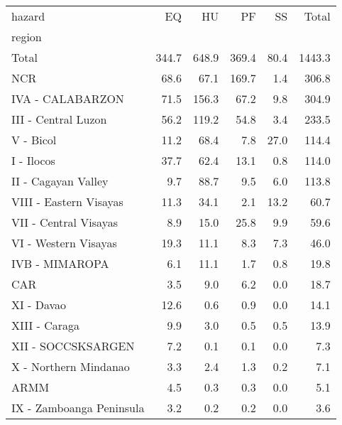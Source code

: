 \begin{tabular}{lrrrrr}
\toprule
hazard &     EQ &     HU &     PF &    SS &   Total \\
region                   &        &        &        &       &         \\
\midrule
Total                    &  344.7 &  648.9 &  369.4 &  80.4 &  1443.3 \\
NCR                      &   68.6 &   67.1 &  169.7 &   1.4 &   306.8 \\
IVA - CALABARZON         &   71.5 &  156.3 &   67.2 &   9.8 &   304.9 \\
III - Central Luzon      &   56.2 &  119.2 &   54.8 &   3.4 &   233.5 \\
V - Bicol                &   11.2 &   68.4 &    7.8 &  27.0 &   114.4 \\
I - Ilocos               &   37.7 &   62.4 &   13.1 &   0.8 &   114.0 \\
II - Cagayan Valley      &    9.7 &   88.7 &    9.5 &   6.0 &   113.8 \\
VIII - Eastern Visayas   &   11.3 &   34.1 &    2.1 &  13.2 &    60.7 \\
VII - Central Visayas    &    8.9 &   15.0 &   25.8 &   9.9 &    59.6 \\
VI - Western Visayas     &   19.3 &   11.1 &    8.3 &   7.3 &    46.0 \\
IVB - MIMAROPA           &    6.1 &   11.1 &    1.7 &   0.8 &    19.8 \\
CAR                      &    3.5 &    9.0 &    6.2 &   0.0 &    18.7 \\
XI - Davao               &   12.6 &    0.6 &    0.9 &   0.0 &    14.1 \\
XIII - Caraga            &    9.9 &    3.0 &    0.5 &   0.5 &    13.9 \\
XII - SOCCSKSARGEN       &    7.2 &    0.1 &    0.1 &   0.0 &     7.3 \\
X - Northern Mindanao    &    3.3 &    2.4 &    1.3 &   0.2 &     7.1 \\
ARMM                     &    4.5 &    0.3 &    0.3 &   0.0 &     5.1 \\
IX - Zamboanga Peninsula &    3.2 &    0.2 &    0.2 &   0.0 &     3.6 \\
\bottomrule
\end{tabular}
